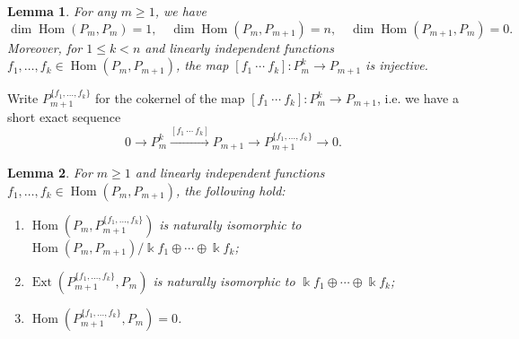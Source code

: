 \documentclass{amsart}
\newtheorem{lemma}{Lemma}[theorem]
\newcommand{\kk}{\Bbbk}
\newcommand{\Ext}{\operatorname{Ext}}
\newcommand{\Hom}{\operatorname{Hom}}
\begin{document}
\begin{lemma}
  For any $m\ge1$, we have 
  \[\dim\Hom(P_m,P_m)=1,\quad \dim\Hom(P_m,P_{m+1})=n,\quad \dim\Hom(P_{m+1},P_m)=0.\]  
  Moreover, for $1\le k<n$ and linearly independent functions $f_1,\ldots,f_k\in\Hom(P_m,P_{m+1})$, the map $[f_1\ \cdots\ f_k]:P_m^k\to P_{m+1}$ is injective. 
\end{lemma}
Write $P_{m+1}^{\{f_1,\ldots,f_k\}}$ for the cokernel of the map $[f_1\ \cdots\ f_k]:P_m^k\to P_{m+1}$, i.e. we have a short exact sequence
\begin{equation}
\label{eq:truncated preprojectives}
  0\longrightarrow P_m^k\stackrel{[f_1\ \cdots\ f_k]}{\longrightarrow} P_{m+1}\longrightarrow P_{m+1}^{\{f_1,\ldots,f_k\}}\longrightarrow 0.
\end{equation}
\begin{lemma}
  For $m\ge1$ and linearly independent functions $f_1,\ldots,f_k\in\Hom(P_m,P_{m+1})$, the following hold:
  \begin{enumerate}
    \item $\Hom(P_m,P_{m+1}^{\{f_1,\ldots,f_k\}})$ is naturally isomorphic to $\Hom(P_m,P_{m+1})/\kk f_1\oplus\cdots\oplus\kk f_k$;
    \item $\Ext(P_{m+1}^{\{f_1,\ldots,f_k\}},P_m)$ is naturally isomorphic to $\kk f_1\oplus\cdots\oplus\kk f_k$;
    \item $\Hom(P_{m+1}^{\{f_1,\ldots,f_k\}},P_m)=0$.
  \end{enumerate}
\end{lemma}
\end{document}
